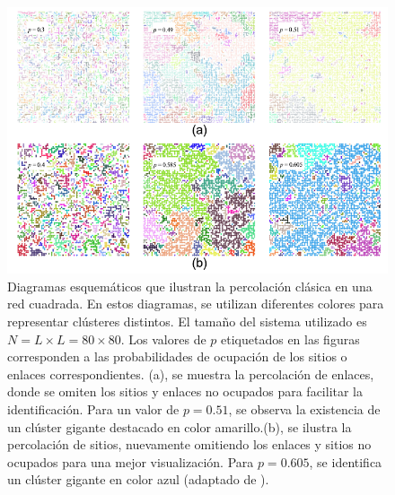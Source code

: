   

\begin{figure}[ht]
	\centering\includegraphics[width=\imsize]{percolacion_enlaces_sitios.png}
	\caption[Diagramas esquemáticos que ilustran la percolación clásica en una red cuadrada.]{Diagramas esquemáticos que ilustran la percolación clásica en una red cuadrada. En estos diagramas, se utilizan diferentes colores para representar clústeres distintos. El tamaño del sistema utilizado es $N = L \times L = 80 \times 80$. Los valores de $p$ etiquetados en las figuras corresponden a las probabilidades de ocupación de los sitios o enlaces correspondientes. (a), se muestra la percolación de enlaces, donde se omiten los sitios y enlaces no ocupados para facilitar la identificación. Para un valor de $p = 0.51$, se observa la existencia de un clúster gigante destacado en color amarillo.(b), se ilustra la percolación de sitios, nuevamente omitiendo los enlaces y sitios no ocupados para una mejor visualización. Para $p = 0.605$, se identifica un clúster gigante en color azul (adaptado de \protect\cite{li_percolation_2021}).}\label{fig:percolacion_enlaces_sitios}
\end{figure}


